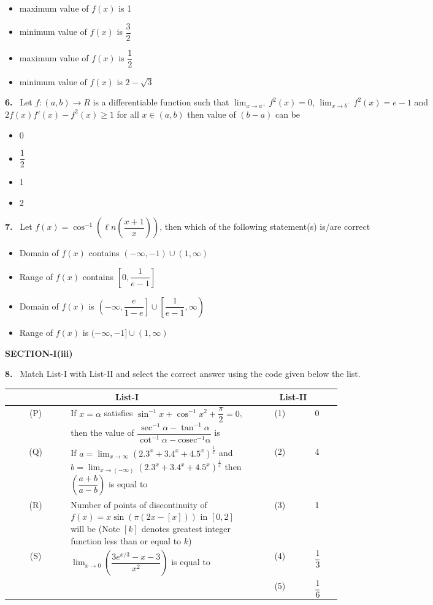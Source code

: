 \documentclass[10pt]{extarticle}
\newcommand{\sect}[1]{\par\smallskip\noindent\textbf{#1}\par}
\newcommand{\qn}[1]{\par\smallskip\noindent\textbf{#1.}~}
\newenvironment{qoptions}{\begin{itemize}[leftmargin=1.8em,itemsep=1pt,topsep=2pt,label={}]}{\end{itemize}}
\newcommand{\opt}[2]{\item[(#1)] #2}
\begin{document}
\begin{multicols}{2}
\begin{qoptions}
\opt{A}{maximum value of $f(x)$ is 1}
\opt{B}{minimum value of $f(x)$ is $\dfrac32$}
\opt{C}{maximum value of $f(x)$ is $\dfrac12$}
\opt{D}{minimum value of $f(x)$ is $2-\sqrt3$}
\end{qoptions}
\qn{6} Let $f:(a,b)\to R$ is a differentiable function such that $\displaystyle\lim_{x\to a^+}f^2(x)=0$, $\displaystyle\lim_{x\to b^-}f^2(x)=e-1$ and $2f(x)f'(x)-f^2(x)\ge1$ for all $x\in(a,b)$ then value of $(b-a)$ can be
\begin{qoptions}
\opt{A}{0}
\opt{B}{$\dfrac12$}
\opt{C}{1}
\opt{D}{2}
\end{qoptions}
\qn{7} Let $f(x)=\cos^{-1}\!\left(\ell n\!\left(\dfrac{x+1}{x}\right)\right)$, then which of the following statement(s) is/are correct
\begin{qoptions}
\opt{A}{Domain of $f(x)$ contains $(-\infty,-1)\cup(1,\infty)$}
\opt{B}{Range of $f(x)$ contains $\left[0,\dfrac1{e-1}\right]$}
\opt{C}{Domain of $f(x)$ is $\left(-\infty,\dfrac e{1-e}\right]\cup\left[\dfrac1{e-1},\infty\right)$}
\opt{D}{Range of $f(x)$ is $(-\infty,-1]\cup(1,\infty)$}
\end{qoptions}
\sect{SECTION-I(iii)}
\qn{8} Match List-I with List-II and select the correct answer using the code given below the list.\par
{\footnotesize\setlength{\tabcolsep}{2pt}\begin{tabular}{|c|p{0.55\linewidth}|c|p{0.08\linewidth}|}
\hline
\multicolumn{2}{|c|}{\textbf{List-I}} & \multicolumn{2}{c|}{\textbf{List-II}}\\ \hline
(P) & If $x=\alpha$ satisfies $\sin^{-1}x+\cos^{-1}x^2+\dfrac\pi2=0$, then the value of $\dfrac{\sec^{-1}\alpha-\tan^{-1}\alpha}{\cot^{-1}\alpha-\mathrm{cosec}^{-1}\alpha}$ is & (1) & 0\\ \hline
(Q) & If $a=\displaystyle\lim_{x\to\infty}(2.3^x+3.4^x+4.5^x)^{\frac1x}$ and $b=\displaystyle\lim_{x\to(-\infty)}(2.3^x+3.4^x+4.5^x)^{\frac1x}$ then $\left(\dfrac{a+b}{a-b}\right)$ is equal to & (2) & 4\\ \hline
(R) & Number of points of discontinuity of $f(x)=x\sin(\pi(2x-[x]))$ in $[0,2]$ will be (Note $[k]$ denotes greatest integer function less than or equal to $k$) & (3) & 1\\ \hline
(S) & $\displaystyle\lim_{x\to0}\left(\dfrac{3e^{x/3}-x-3}{x^2}\right)$ is equal to & (4) & $\dfrac13$\\ \hline
 & & (5) & $\dfrac16$\\ \hline
\end{tabular}}\par

\end{multicols}
\end{document}
